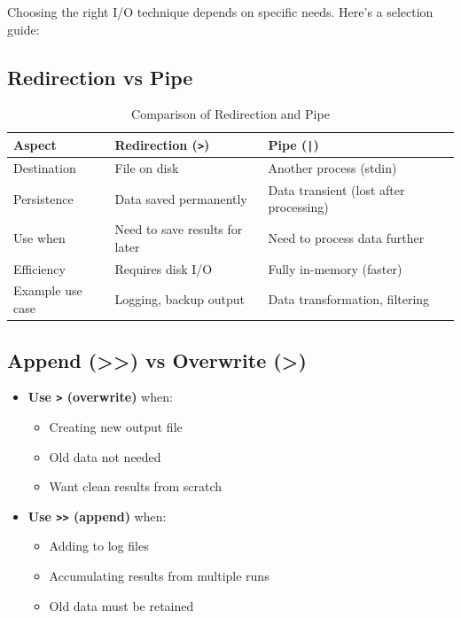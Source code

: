 Choosing the right I/O technique depends on specific needs. Here's a selection guide:

\subsection{Redirection vs Pipe}

\begin{table}[htbp]
	\centering
	\caption{Comparison of Redirection and Pipe}
	\label{tab:redirect-vs-pipe}
	\begin{tabular}{@{}p{4cm}p{5cm}p{5cm}@{}}
		\toprule
		\textbf{Aspect}  & \textbf{Redirection (\texttt{>})} & \textbf{Pipe (\texttt{|})}             \\
		\midrule
		Destination      & File on disk                      & Another process (stdin)                \\
		Persistence      & Data saved permanently            & Data transient (lost after processing) \\
		Use when         & Need to save results for later    & Need to process data further           \\
		Efficiency       & Requires disk I/O                 & Fully in-memory (faster)               \\
		Example use case & Logging, backup output            & Data transformation, filtering         \\
		\bottomrule
	\end{tabular}
\end{table}

\subsection{Append (>>) vs Overwrite (>)}

\begin{itemize}
	\item \textbf{Use \texttt{>} (overwrite)} when:
	      \begin{itemize}
		      \item Creating new output file
		      \item Old data not needed
		      \item Want clean results from scratch
	      \end{itemize}

	\item \textbf{Use \texttt{>>} (append)} when:
	      \begin{itemize}
		      \item Adding to log files
		      \item Accumulating results from multiple runs
		      \item Old data must be retained
	      \end{itemize}
\end{itemize}


